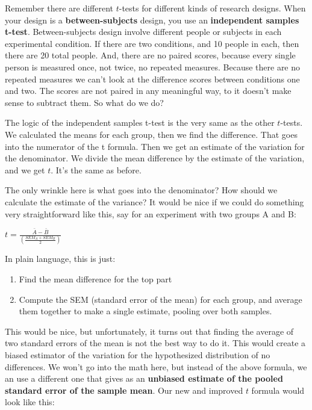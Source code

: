 \documentclass[
  letterpaper,
  DIV=11,
  numbers=noendperiod]{scrreprt}
\providecommand{\tightlist}{%
  \setlength{\itemsep}{0pt}\setlength{\parskip}{0pt}}\usepackage{longtable,booktabs,array}
\begin{document}
Remember there are different \(t\)-tests for different kinds of research
designs. When your design is a \textbf{between-subjects} design, you use
an \textbf{independent samples t-test}. Between-subjects design involve
different people or subjects in each experimental condition. If there
are two conditions, and 10 people in each, then there are 20 total
people. And, there are no paired scores, because every single person is
measured once, not twice, no repeated measures. Because there are no
repeated measures we can't look at the difference scores between
conditions one and two. The scores are not paired in any meaningful way,
to it doesn't make sense to subtract them. So what do we do?

The logic of the independent samples t-test is the very same as the
other \(t\)-tests. We calculated the means for each group, then we find
the difference. That goes into the numerator of the t formula. Then we
get an estimate of the variation for the denominator. We divide the mean
difference by the estimate of the variation, and we get \(t\). It's the
same as before.

The only wrinkle here is what goes into the denominator? How should we
calculate the estimate of the variance? It would be nice if we could do
something very straightforward like this, say for an experiment with two
groups A and B:

\(t = \frac{\bar{A}-\bar{B}}{(\frac{SEM_A+SEM_B}{2})}\)

In plain language, this is just:

\begin{enumerate}
\def\labelenumi{\arabic{enumi}.}
\tightlist
\item
  Find the mean difference for the top part
\item
  Compute the SEM (standard error of the mean) for each group, and
  average them together to make a single estimate, pooling over both
  samples.
\end{enumerate}

This would be nice, but unfortunately, it turns out that finding the
average of two standard errors of the mean is not the best way to do it.
This would create a biased estimator of the variation for the
hypothesized distribution of no differences. We won't go into the math
here, but instead of the above formula, we an use a different one that
gives as an \textbf{unbiased estimate of the pooled standard error of
the sample mean}. Our new and improved \(t\) formula would look like
this:
\end{document}

